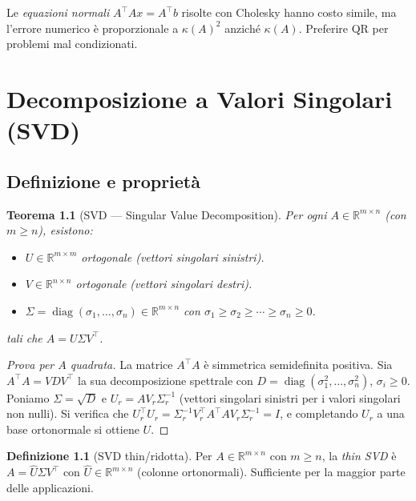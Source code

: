 \documentclass[11pt, a4paper, twoside]{book}
\theoremstyle{definition}
\newtheorem{defn}{Definizione}[chapter]
\theoremstyle{plain}
\newtheorem{thm}{Teorema}[chapter]
\theoremstyle{remark}
\DeclareMathOperator{\diag}{diag}
\newcommand{\R}{\mathbb{R}}
\begin{document}
\begin{warningbox}
Le \emph{equazioni normali} $A^\top Ax = A^\top b$ risolte con Cholesky hanno costo simile, ma l'errore numerico è proporzionale a $\kappa(A)^2$ anziché $\kappa(A)$. Preferire QR per problemi mal condizionati.
\end{warningbox}

\chapter{Decomposizione a Valori Singolari (SVD)}
\label{sec:svd}

\section{Definizione e proprietà}

\begin{thm}[SVD — Singular Value Decomposition]
Per ogni $A \in \R^{m \times n}$ (con $m \geq n$), esistono:
\begin{itemize}
  \item $U \in \R^{m \times m}$ ortogonale (vettori singolari sinistri).
  \item $V \in \R^{n \times n}$ ortogonale (vettori singolari destri).
  \item $\Sigma = \diag(\sigma_1, \ldots, \sigma_n) \in \R^{m \times n}$ con $\sigma_1 \geq \sigma_2 \geq \cdots \geq \sigma_n \geq 0$.
\end{itemize}
tali che $A = U \Sigma V^\top$.
\end{thm}

\begin{proof}[Prova per $A$ quadrata]
La matrice $A^\top A$ è simmetrica semidefinita positiva. Sia $A^\top A = V D V^\top$ la sua decomposizione spettrale con $D = \diag(\sigma_1^2, \ldots, \sigma_n^2)$, $\sigma_i \geq 0$. Poniamo $\Sigma = \sqrt{D}$ e $U_r = AV_r \Sigma_r^{-1}$ (vettori singolari sinistri per i valori singolari non nulli). Si verifica che $U_r^\top U_r = \Sigma_r^{-1} V_r^\top A^\top A V_r \Sigma_r^{-1} = I$, e completando $U_r$ a una base ortonormale si ottiene $U$.
\end{proof}

\begin{defn}[SVD thin/ridotta]
Per $A \in \R^{m \times n}$ con $m \geq n$, la \emph{thin SVD} è $A = \hat{U} \Sigma V^\top$ con $\hat{U} \in \R^{m \times n}$ (colonne ortonormali). Sufficiente per la maggior parte delle applicazioni.
\end{defn}
\end{document}

